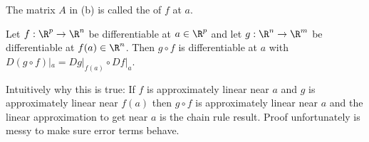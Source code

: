 \begin{definition}
The matrix $A$ in (b) is called the  of $f$ at $a$.
\end{definition}

\begin{theorem} \label{thm:2.6}
Let $f:\R^p\to \R^n$ be differentiable at $a\in \R^p$ and let $g: \R^n\to \R^m$ be differentiable at $f(a)\in \R^n$. Then $g\circ f$ is differentiable at $a$ with $D(g\circ f) |_a = Dg|_{f(a)}\circ Df|_a$.
\end{theorem}
\begin{remark}
Intuitively why this is true: If $f$ is approximately linear near $a$ and $g$ is approximately linear near $f(a)$ then $g\circ f$ is approximately linear near $a$ and the linear approximation to get near $a$ is the chain rule result. Proof unfortunately is messy to make sure error terms behave.
\end{remark}

